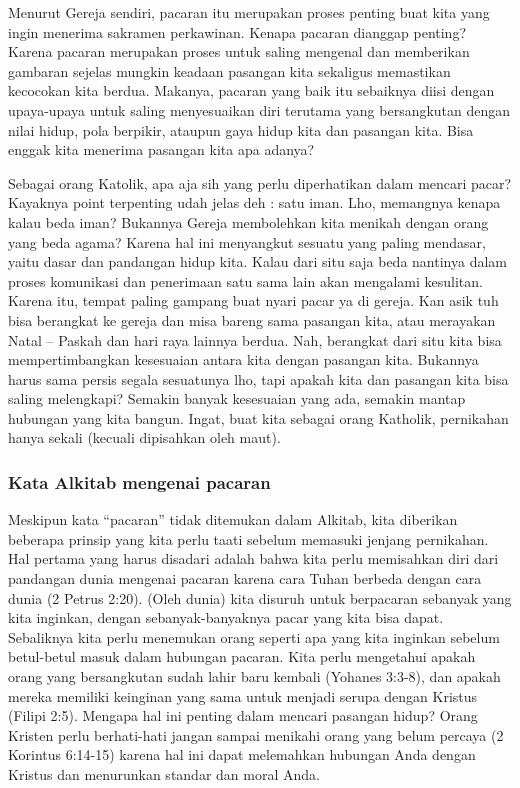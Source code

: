 \documentclass[a4paper,11pt,openany]{article}
\begin{document}
Menurut Gereja sendiri, pacaran itu merupakan proses penting buat kita yang ingin menerima sakramen perkawinan. Kenapa pacaran dianggap penting? Karena pacaran merupakan proses untuk saling mengenal dan memberikan gambaran sejelas mungkin keadaan pasangan kita sekaligus memastikan kecocokan kita berdua. Makanya, pacaran yang baik itu sebaiknya diisi dengan upaya-upaya untuk saling menyesuaikan diri terutama yang bersangkutan dengan nilai hidup, pola berpikir, ataupun gaya hidup kita dan pasangan kita. Bisa enggak kita menerima pasangan kita apa adanya?\cite{ryant2008}

Sebagai orang Katolik, apa aja sih yang perlu diperhatikan dalam mencari pacar? Kayaknya point terpenting udah jelas deh : satu iman. Lho, memangnya kenapa kalau beda iman? Bukannya Gereja membolehkan kita menikah dengan orang yang beda agama? Karena hal ini menyangkut sesuatu yang paling mendasar, yaitu dasar dan pandangan hidup kita. Kalau dari situ saja beda nantinya dalam proses komunikasi dan penerimaan satu sama lain akan mengalami kesulitan. Karena itu, tempat paling gampang buat nyari pacar ya di gereja. Kan asik tuh bisa berangkat ke gereja dan misa bareng sama pasangan kita, atau merayakan Natal – Paskah dan hari raya lainnya berdua. Nah, berangkat dari situ kita bisa mempertimbangkan kesesuaian antara kita dengan pasangan kita. Bukannya harus sama persis segala sesuatunya lho, tapi apakah kita dan pasangan kita bisa saling melengkapi? Semakin banyak kesesuaian yang ada, semakin mantap hubungan yang kita bangun. Ingat, buat kita sebagai orang Katholik, pernikahan hanya sekali (kecuali dipisahkan oleh maut).

\subsubsection*{Kata Alkitab mengenai pacaran}
Meskipun kata ``pacaran'' tidak ditemukan dalam Alkitab, kita diberikan beberapa prinsip yang kita perlu taati sebelum memasuki jenjang pernikahan. Hal pertama yang harus disadari adalah bahwa kita perlu memisahkan diri dari pandangan dunia mengenai pacaran karena cara Tuhan berbeda dengan cara dunia (2 Petrus 2:20). (Oleh dunia) kita disuruh untuk berpacaran sebanyak yang kita inginkan, dengan sebanyak-banyaknya pacar yang kita bisa dapat. Sebaliknya kita perlu menemukan orang seperti apa yang kita inginkan sebelum betul-betul masuk dalam hubungan pacaran. Kita perlu mengetahui apakah orang yang bersangkutan sudah lahir baru kembali (Yohanes 3:3-8), dan apakah mereka memiliki keinginan yang sama untuk menjadi serupa dengan Kristus (Filipi 2:5). Mengapa hal ini penting dalam mencari pasangan hidup? Orang Kristen perlu berhati-hati jangan sampai menikahi orang yang belum percaya (2 Korintus 6:14-15) karena hal ini dapat melemahkan hubungan Anda dengan Kristus dan menurunkan standar dan moral Anda.
\end{document}
